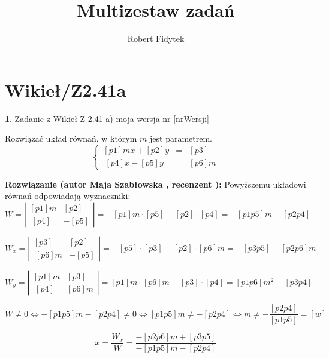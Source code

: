 \documentclass[12pt, a4paper]{article}
\title{Multizestaw zadań}
\author{Robert Fidytek}
\date{}
\theoremstyle{definition} %
\newtheorem{zad}{}
\newcommand{\kategoria}[1]{\section{#1}} %
\newcommand{\zadStart}[1]{\begin{zad}#1\newline} %
\newcommand{\zadStop}{\end{zad}}   %
\newcommand{\rozwStart}[2]{\noindent \textbf{Rozwiązanie (autor #1 , recenzent #2): }\newline} %
\begin{document}
\maketitle


\kategoria{Wikieł/Z2.41a}
\zadStart{Zadanie z Wikieł Z 2.41 a)  moja wersja nr [nrWersji]}

Rozwiązać układ równań, w którym $m$ jest parametrem.
$$\left\{\begin{array}{ccc}
[p1]mx+[p2]y&=&[p3]\\
\ [p4]x-[p5]y&=&[p6]m
\end{array} \right.$$

\zadStop
\rozwStart{Maja Szabłowska}{}
Powyższemu układowi równań odpowiadają wyznaczniki:
$$W=\left| \begin{array}{lccr} [p1]m & [p2] \\ \ [p4] & -[p5] \end{array}\right| = -[p1]m\cdot[p5] - [p2]\cdot[p4]=-[p1p5]m-[p2p4]$$

$$W_{x}=\left| \begin{array}{lccr} [p3] & [p2] \\ \ [p6]m & -[p5] \end{array}\right| = -[p5]\cdot[p3] - [p2]\cdot[p6]m=-[p3p5]-[p2p6]m$$

$$W_{y}=\left| \begin{array}{lccr} [p1]m & [p3] \\ \ [p4] & [p6]m \end{array}\right| = [p1]m\cdot[p6]m - [p3]\cdot[p4]=[p1p6]m^{2}-[p3p4]$$

$$W\neq 0 \iff -[p1p5]m-[p2p4]\neq 0 \iff [p1p5]m\neq-[p2p4] \iff m\neq -\frac{[p2p4]}{[p1p5]}=[w]$$

$$x=\frac{W_{x}}{W}=\frac{-[p2p6]m+[p3p5]}{-[p1p5]m-[p2p4]}$$
\end{document}
